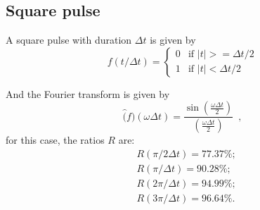 \documentclass[12pt,letterpaper]{article}
\begin{document}
{\subsection{Square pulse}
A square pulse with duration \(\Delta t\) is given  by
\begin{equation}\label{eq:square_time}
f(t/\Delta t) =
\begin{cases}
    0 &\mbox{if } |t| >= \Delta t/2 \\
    1 & \mbox{if } |t| < \Delta t/2
\end{cases} 
\end{equation}

And the Fourier transform is given by
\begin{equation}\label{eq:square_freq}
\hat(f)(\omega \Delta t) = \frac{\sin\left(\frac{\omega \Delta t}{2}\right)}{\left(\frac{\omega \Delta t}{2}\right)} \enspace ,
\end{equation}
for this case, the ratios \(R\) are:
\begin{align*}
    &R(\pi/2\Delta t) = 77.37\%;\\
    &R(\pi/\Delta t) = 90.28\%;\\
    &R(2\pi/\Delta t) = 94.99\%;\\
    &R(3\pi/\Delta t) = 96.64\%.
\end{align*}

}
\end{document}
